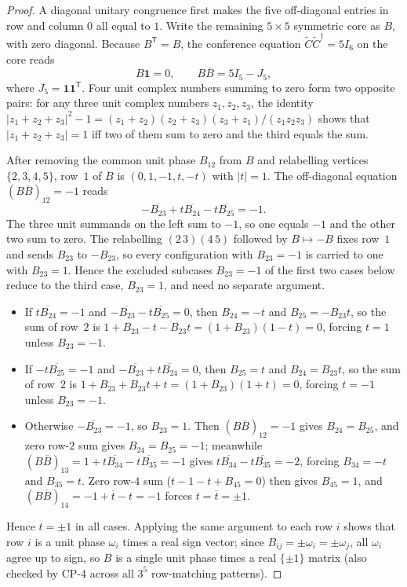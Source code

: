 \begin{proof}
A diagonal unitary congruence first makes the five off-diagonal
entries in row and column $0$ all equal to $1$. Write the remaining
$5\times5$ symmetric core as $B$, with zero diagonal. Because $B^{\mathsf T}=B$, the conference equation $\widetilde C\widetilde C^\dagger=5I_6$ on the core reads
\[
 B\mathbf 1=0,\qquad B\overline B=5I_5-J_5,
\]
where $J_5=\mathbf 1\mathbf 1^{\mathsf T}$. Four unit complex numbers summing to zero form two opposite pairs: for any three unit complex numbers $z_1,z_2,z_3$, the identity $|z_1+z_2+z_3|^2-1=(z_1+z_2)(z_2+z_3)(z_3+z_1)/(z_1z_2z_3)$ shows that $|z_1+z_2+z_3|=1$ iff two of them sum to zero and the third equals the sum.

After removing the common unit phase $B_{12}$ from $B$ and relabelling vertices $\{2,3,4,5\}$, row~$1$ of $B$ is $(0,1,-1,t,-t)$ with $|t|=1$. The off-diagonal equation $(B\overline B)_{12}=-1$ reads
\[
 -\overline{B_{23}}+t\overline{B_{24}}-t\overline{B_{25}}=-1.
\]
The three unit summands on the left sum to $-1$, so one equals $-1$ and the other two sum to zero.
The relabelling $(2\,3)(4\,5)$ followed by $B\mapsto-B$ fixes row~$1$ and sends $B_{23}$ to $-B_{23}$, so
every configuration with $B_{23}=-1$ is carried to one with $B_{23}=1$. Hence the excluded subcases $B_{23}=-1$ of the first two cases below reduce to the third case, $B_{23}=1$, and need no
separate argument.
\begin{itemize}
\item If $t\overline{B_{24}}=-1$ and $-\overline{B_{23}}-t\overline{B_{25}}=0$, then $B_{24}=-t$ and $B_{25}=-B_{23}t$, so the sum of row~$2$ is $1+B_{23}-t-B_{23}t=(1+B_{23})(1-t)=0$, forcing $t=1$ unless $B_{23}=-1$.
\item If $-t\overline{B_{25}}=-1$ and $-\overline{B_{23}}+t\overline{B_{24}}=0$, then $B_{25}=t$ and $B_{24}=B_{23}t$, so the sum of row~$2$ is $1+B_{23}+B_{23}t+t=(1+B_{23})(1+t)=0$, forcing $t=-1$ unless $B_{23}=-1$.
\item Otherwise $-\overline{B_{23}}=-1$, so $B_{23}=1$. Then $(B\overline B)_{12}=-1$ gives $B_{24}=B_{25}$, and zero row-$2$ sum gives $B_{24}=B_{25}=-1$; meanwhile $(B\overline B)_{13}=1+t\overline{B_{34}}-t\overline{B_{35}}=-1$ gives $t\overline{B_{34}}-t\overline{B_{35}}=-2$, forcing $B_{34}=-t$ and $B_{35}=t$. Zero row-$4$ sum ($t-1-t+B_{45}=0$) then gives $B_{45}=1$, and $(B\overline B)_{14}=-1+\overline t-t=-1$ forces $t=\overline t=\pm1$.
\end{itemize}
Hence $t=\pm1$ in all cases. Applying the same argument to each row $i$ shows that row $i$ is a unit phase $\omega_i$ times a real sign vector; since $B_{ij}=\pm\omega_i=\pm\omega_j$, all $\omega_i$ agree up to sign, so $B$ is a single unit phase times a real $\{\pm1\}$ matrix (also checked by CP-4 across all $3^5$ row-matching patterns).


\end{proof}
